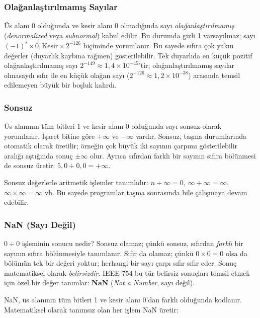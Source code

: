 \subsubsection{Olağanlaştırılmamış Sayılar}

Üs alanı 0 olduğunda ve kesir alanı 0 olmadığında sayı \emph{olağanlaştırılmamış} (\emph{denormalized} veya \emph{subnormal}) kabul edilir. Bu durumda gizli 1 varsayılmaz; sayı $(-1)^i \times 0{,}\text{Kesir} \times 2^{-126}$ biçiminde yorumlanır. Bu sayede sıfıra çok yakın değerler (duyarlık kaybına rağmen) gösterilebilir. Tek duyarlıda en küçük pozitif olağanlaştırılmamış sayı $2^{-149} \approx 1{,}4 \times 10^{-45}$'tir; olağanlaştırılmamış sayılar olmasaydı sıfır ile en küçük olağan sayı ($2^{-126} \approx 1{,}2 \times 10^{-38}$) arasında temsil edilemeyen büyük bir boşluk kalırdı.

\subsubsection{Sonsuz}

Üs alanının tüm bitleri 1 ve kesir alanı 0 olduğunda sayı sonsuz olarak yorumlanır. İşaret bitine göre $+\infty$ ve $-\infty$ vardır. Sonsuz, taşma durumlarında otomatik olarak üretilir; örneğin çok büyük iki sayının çarpımı gösterilebilir aralığı aştığında sonuç $\pm\infty$ olur. Ayrıca sıfırdan farklı bir sayının sıfıra bölünmesi de sonsuz üretir: $5{,}0 \div 0{,}0 = +\infty$.

Sonsuz değerlerle aritmetik işlemler tanımlıdır: $n \div \infty = 0$, $\infty + \infty = \infty$, $\infty \times \infty = \infty$ vb. Bu sayede programlar taşma sonrasında bile çalışmaya devam edebilir.

\subsubsection{NaN (Sayı Değil)}

$0 \div 0$ işleminin sonucu nedir? Sonsuz olamaz; çünkü sonsuz, sıfırdan \emph{farklı} bir sayının sıfıra bölünmesiyle tanımlanır. Sıfır da olamaz; çünkü $0 \times 0 = 0$ olsa da bölümün tek bir değeri yoktur; herhangi bir sayı çarpı sıfır sıfır eder. Sonuç matematiksel olarak \emph{belirsizdir}. IEEE 754 bu tür belirsiz sonuçları temsil etmek için özel bir değer tanımlar: \textbf{NaN} (\emph{Not a Number}, sayı değil).

NaN, üs alanının tüm bitleri 1 ve kesir alanı 0'dan farklı olduğunda kodlanır. Matematiksel olarak tanımsız olan her işlem NaN üretir:

